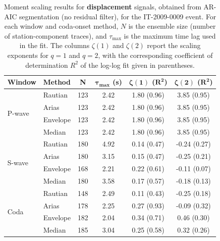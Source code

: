 \begin{table}[H]
\centering
\small
\begin{tabular}{llcccc}
\toprule
\textbf{Window} & \textbf{Method} & \textbf{N} & $\bm{\tau_{\max}}$ \textbf{(s)} & $\bm{\zeta(1)}$ \textbf{(}$\bm{R^2}$\textbf{)} & $\bm{\zeta(2)}$ \textbf{(}$\bm{R^2}$\textbf{)} \\
\midrule
\multirow{4}{*}{P-wave}
& Rautian & 123 & 2.42 & 1.80 (0.96) & 3.85 (0.95) \\
& Arias & 123 & 2.42 & 1.80 (0.96) & 3.85 (0.95) \\
& Envelope & 123 & 2.42 & 1.80 (0.96) & 3.85 (0.95) \\
& Median & 123 & 2.42 & 1.80 (0.96) & 3.85 (0.95) \\
\midrule
\multirow{4}{*}{S-wave}
& Rautian & 180 & 4.92 & 0.14 (0.47) & -0.24 (0.27) \\
& Arias & 180 & 3.15 & 0.15 (0.47) & -0.25 (0.21) \\
& Envelope & 168 & 2.21 & 0.22 (0.61) & -0.11 (0.07) \\
& Median & 180 & 3.58 & 0.17 (0.57) & -0.18 (0.13) \\
\midrule
\multirow{4}{*}{Coda}
& Rautian & 148 & 2.49 & 0.11 (0.43) & -0.25 (0.18) \\
& Arias & 178 & 2.25 & 0.27 (0.93) & -0.09 (0.32) \\
& Envelope & 182 & 2.04 & 0.34 (0.71) & 0.46 (0.30) \\
& Median & 185 & 3.04 & 0.25 (0.58) & 0.32 (0.26) \\
\bottomrule
\end{tabular}
\caption{Moment scaling results for \textbf{displacement} signals, obtained from AR-AIC segmentation (no residual filter), for the IT-2009-0009 event. For each window and coda-onset method, $N$ is the ensemble size (number of station-component traces), and $\tau_{\max}$ is the maximum time lag used in the fit. The columns $\zeta(1)$ and $\zeta(2)$ report the scaling exponents for $q=1$ and $q=2$, with the corresponding coefficient of determination $R^2$ of the log-log fit given in parentheses.}
\label{tab:ar_aic_scaling_disp_nothresh_laquila}
\end{table}